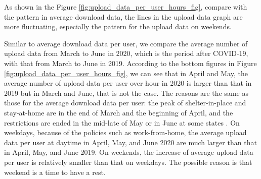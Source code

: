 As shown in the Figure \ref{fig:upload_data_per_user_hours_fig}, compare with the pattern in average download data, the lines in the upload data graph are more fluctuating, especially the pattern for the upload data on weekends. 

Similar to average download data per user, we compare the average number of upload data from March to June in 2020, which is the period after COVID-19, with that from March to June in 2019. According to the bottom figures in Figure \ref{fig:upload_data_per_user_hours_fig}, we can see that in April and May, the average number of upload data per user over hour in 2020 is larger than that in 2019 but in March and June, that is not the case. The reasons are the same as those for the average download data per user: the peak of shelter-in-place and stay-at-home are in the end of March and the beginning of April, and the restrictions are ended in the mid-late of May or in June at some states \cite{covid19restriction}. On weekdays, because of the policies such as work-from-home, the average upload data per user at daytime in April, May, and June 2020 are much larger than that in April, May, and June 2019. On weekends, the increase of average upload data per user is relatively smaller than that on weekdays. The possible reason is that weekend is a time to have a rest.  